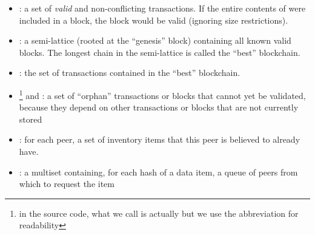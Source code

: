 \begin{itemize}
\item {}: a set of \emph{valid} and non-conflicting transactions. If the entire contents of  were included in a block, the block would be valid (ignoring size restrictions).
\item {}: a semi-lattice (rooted at the ``genesis'' block) containing all known valid blocks. The longest chain in the semi-lattice is called the ``best'' blockchain.
\item {}: the set of transactions contained in the ``best'' blockchain.
\item {}\footnote{in the source code, what we call  is actually  but we use the abbreviation for readability} and : a set of ``orphan'' transactions or blocks that cannot yet be validated, because they depend on other transactions or blocks that are not currently stored
\item {}: for each peer, a set of inventory items that this peer is believed to already have.
\item {}: a multiset containing, for each hash of a data item, a queue of peers from which to request the item
\end{itemize}

